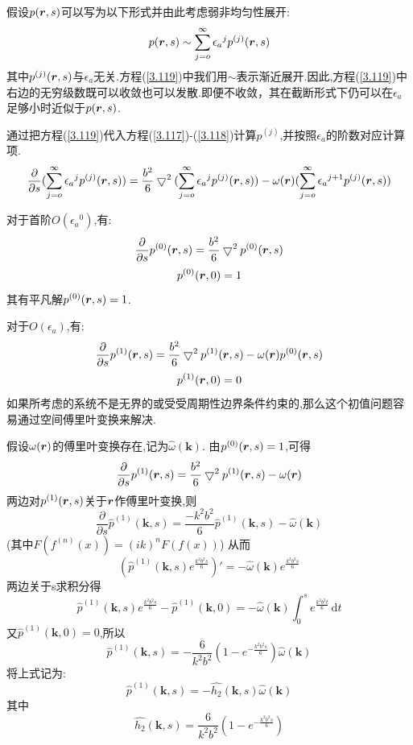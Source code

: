 假设$p(\bm{r} ,s)$可以写为以下形式并由此考虑弱非均匀性展开:
\begin{equation}
p(\bm{r} ,s) \sim \sum_{j=o}^{\infty} {\epsilon_a}^j p^{(j)} (\bm{r} ,s) \label{3.119}
\end{equation}
其中$p^{(j)} (\bm{r} ,s)$与$\epsilon_a$无关.方程(\ref{3.119})中我们用$\sim$表示渐近展开.因此,方程(\ref{3.119})中右边的无穷级数既可以收敛也可以发散.即便不收敛，其在截断形式下仍可以在$\epsilon_a$足够小时近似于$p(\bm{r} ,s)$.

通过把方程(\ref{3.119})代入方程(\ref{3.117})-(\ref{3.118})计算$p^{(j)}$,并按照$\epsilon_a$的阶数对应计算项.
$$\frac{\partial}{\partial s} (\sum_{j=o}^{\infty} {\epsilon_a}^j p^{(j)} (\bm{r} ,s)) = \frac{b^2}{6} \bigtriangledown^2 (\sum_{j=o}^{\infty} {\epsilon_a}^j p^{(j)} (\bm{r} ,s)) - \omega(\bm{r} ) (\sum_{j=o}^{\infty} {\epsilon_a}^{j+1} p^{(j)} (\bm{r} ,s))$$

对于首阶$O({\epsilon_a}^0)$,有:
\begin{equation}
\frac{\partial}{\partial s} p^{(0)}(\bm{r} ,s) = \frac{b^2}{6} \bigtriangledown^2 p^{(0)}(\bm{r} ,s)
\end{equation}
\begin{equation}
p^{(0)}(\bm{r} ,0) = 1
\end{equation}
其有平凡解$p^{(0)}(\bm{r} ,s) = 1$.

对于$O(\epsilon_a)$,有:
\begin{equation}
\frac{\partial}{\partial s} p^{(1)}(\bm{r} ,s) = \frac{b^2}{6} \bigtriangledown^2 p^{(1)}(\bm{r} ,s)-\omega(\bm{r} ) p^{(0)}(\bm{r} ,s)
\end{equation}
\begin{equation}
p^{(1)}(\bm{r} ,0) = 0
\end{equation}
如果所考虑的系统不是无界的或受受周期性边界条件约束的,那么这个初值问题容易通过空间傅里叶变换来解决.

假设$\omega(\bm{r} )$的傅里叶变换存在,记为$\hat{\omega}(\mathbf{k})$.
由$p^{(0)}(\bm{r} ,s) = 1$,可得
$$\frac{\partial}{\partial s} p^{(1)}(\bm{r} ,s) = \frac{b^2}{6} \bigtriangledown^2 p^{(1)}(\bm{r} ,s)-\omega(\bm{r} )$$
两边对$p^{(1)}(\bm{r} ,s)$关于$\bm{r} $作傅里叶变换,则
$$\frac{\partial}{\partial s}\hat{p}^{(1)}(\mathbf{k},s) = \frac{-k^2 b^2}{6} \hat{p}^{(1)}(\mathbf{k},s)-\hat{\omega}(\mathbf{k})$$
(其中$F(f^{(n)}(x)) = (ik)^n F(f(x))$)
从而$$(\hat{p}^{(1)}(\mathbf{k},s)e^{\frac{k^2 b^2 s}{6}})' = -\hat{\omega}(\mathbf{k}) e^{\frac{k^2 b^2 s}{6}}$$
两边关于s求积分得
$$\hat{p}^{(1)}(\mathbf{k},s)e^{\frac{k^2 b^2 s}{6}}-\hat{p}^{(1)}(\mathbf{k},0) = -\hat{\omega}(\mathbf{k}) \int_{0}^{s} e^{\frac{k^2 b^2 t}{6}}\, \mathrm{d}t$$
又$\hat{p}^{(1)} (\mathbf{k},0) = 0$,所以
$$\hat{p}^{(1)}(\mathbf{k},s) = -\frac{6}{k^2 b^2} (1-e^{-\frac{k^2 b^2 s}{6}}) \hat{\omega}(\mathbf{k})$$
将上式记为:
\begin{equation}
\hat{p}^{(1)}(\mathbf{k},s) = -\hat{h_2}(\mathbf{k},s) \hat{\omega}(\mathbf{k})
\end{equation}
其中
\begin{equation}
\hat{h_2}(\mathbf{k},s) = \frac{6}{k^2 b^2} (1-e^{-\frac{k^2 b^2 s}{6}})
\end{equation}

